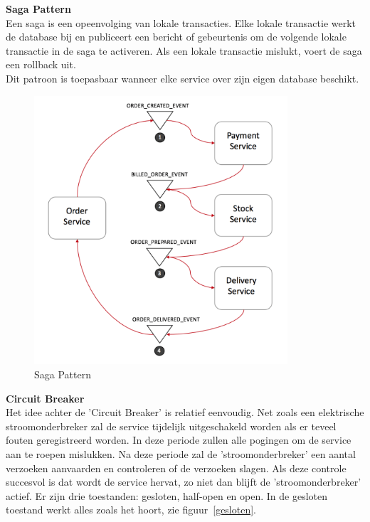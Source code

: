 \textbf{Saga Pattern}
\\Een saga is een opeenvolging van lokale transacties. Elke lokale transactie werkt de database bij en publiceert een bericht of gebeurtenis om de volgende lokale transactie in de saga te activeren. Als een lokale transactie mislukt, voert de saga een rollback uit.\\
Dit patroon is toepasbaar wanneer elke service over zijn eigen database beschikt.

\begin{figure}[!htb]
    \centering
    \includegraphics[height=10cm]{Saga.png}
    \caption{Saga Pattern \label{Saga}}
\end{figure}

\textbf{Circuit Breaker}\\
Het idee achter de 'Circuit Breaker' is relatief eenvoudig. Net zoals een elektrische stroomonderbreker zal de service tijdelijk uitgeschakeld worden als er teveel fouten geregistreerd worden. In deze periode zullen alle pogingen om de service aan te roepen mislukken. Na deze periode zal de 'stroomonderbreker' een aantal verzoeken aanvaarden en controleren of de verzoeken slagen. Als deze controle succesvol is dat wordt de service hervat, zo niet dan blijft de 'stroomonderbreker' actief.
Er zijn drie toestanden: gesloten, half-open en open. In de gesloten toestand werkt alles zoals het hoort, zie figuur~\ref{gesloten}. 


